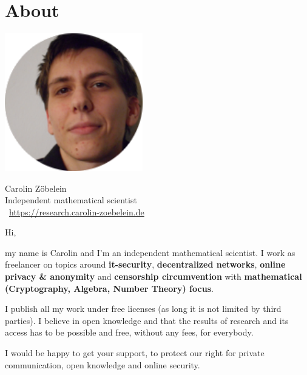 \section*{About}
\label{s:about}
\begin{minipage}[l]{0.39\textwidth}
		\begin{flushleft}
            \includegraphics[width=0.45\textwidth]{images/zoebelein_avatar.png}
		\end{flushleft}
\end{minipage}
\begin{minipage}[r]{0.59\textwidth}
		\begin{flushright}
	        Carolin Zöbelein\\
            Independent mathematical scientist\\
            \faGlobe \ \url{https://research.carolin-zoebelein.de}
		\end{flushright}
\end{minipage}

\begin{flushleft}
Hi,

my name is Carolin and I'm an independent mathematical scientist. I work as freelancer on topics around \textbf{it-security}, \textbf{decentralized networks}, \textbf{online privacy \& anonymity} and \textbf{censorship circumvention} with \textbf{mathematical (Cryptography, Algebra, Number Theory) focus}.

I publish all my work under free licenses (as long it is not limited by third parties). I believe in open knowledge and that the results of research and its access has to be possible and free, without any fees, for everybody.

I would be happy to get your support, to protect our right for private communication, open knowledge and online security.
\end{flushleft}


